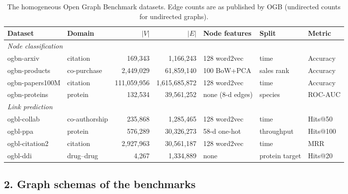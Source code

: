\begin{table}[htbp]
\centering
\small
\setlength{\tabcolsep}{3.5pt}
\caption{The homogeneous Open Graph Benchmark datasets. Edge counts are as published by
OGB (undirected counts for undirected graphs).}
\label{p1:tab:ogbstats}
\begin{tabular}{llrrlll}
\toprule
Dataset & Domain & $|V|$ & $|E|$ & Node features & Split & Metric \\
\midrule
\multicolumn{7}{l}{\emph{Node classification}}\\
ogbn-arxiv      & citation     & 169{,}343      & 1{,}166{,}243        & 128 word2vec     & time       & Accuracy \\
ogbn-products   & co-purchase  & 2{,}449{,}029  & 61{,}859{,}140       & 100 BoW+PCA      & sales rank & Accuracy \\
ogbn-papers100M & citation     & 111{,}059{,}956& 1{,}615{,}685{,}872  & 128 word2vec     & time       & Accuracy \\
ogbn-proteins   & protein      & 132{,}534      & 39{,}561{,}252       & none (8-d edges) & species    & ROC-AUC \\
\midrule
\multicolumn{7}{l}{\emph{Link prediction}}\\
ogbl-collab     & co-authorship& 235{,}868      & 1{,}285{,}465        & 128 word2vec     & time       & Hits@50 \\
ogbl-ppa        & protein      & 576{,}289      & 30{,}326{,}273       & 58-d one-hot     & throughput & Hits@100 \\
ogbl-citation2  & citation     & 2{,}927{,}963  & 30{,}561{,}187       & 128 word2vec     & time       & MRR \\
ogbl-ddi        & drug--drug   & 4{,}267        & 1{,}334{,}889        & none             & protein target & Hits@20 \\
\bottomrule
\end{tabular}
\end{table}

\subsection*{2. Graph schemas of the benchmarks}

